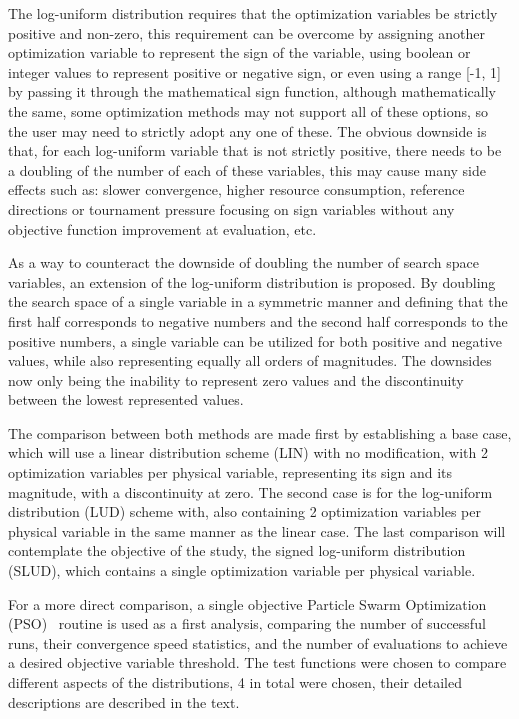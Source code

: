 \documentclass[10pt,fleqn,a4paper,twoside]{article}
\begin{document}
The log-uniform distribution requires that the optimization variables be strictly positive and non-zero, this requirement can be overcome by assigning another optimization variable
to represent the sign of the variable, using boolean or integer values to represent positive or negative sign, or even using a range [-1, 1] by passing it through the mathematical sign function, 
although mathematically the same, some optimization methods may not support all of these options, so the user may need to strictly adopt any one of these. The obvious downside is that, for each
log-uniform variable that is not strictly positive, there needs to be a doubling of the number of each of these variables, this may cause many side effects such as: slower convergence, higher 
resource consumption, reference directions or tournament pressure focusing on sign variables without any objective function improvement at evaluation, etc.

As a way to counteract the downside of doubling the number of search space variables, an extension of the log-uniform distribution is proposed. By doubling the search space of a single variable in 
a symmetric manner and defining that the first half corresponds to negative numbers and the second half corresponds to the positive numbers, a single variable can be utilized for both positive and
negative values, while also representing equally all orders of magnitudes. The downsides now only being the inability to represent zero values and the discontinuity between the lowest
represented values. 

The comparison between both methods are made first by establishing a base case, which will use a linear distribution scheme (LIN) with no modification, with 2 optimization variables per physical variable, representing 
its sign and its magnitude, with a discontinuity at zero. The second case is for the log-uniform distribution (LUD) scheme with, also containing 2 optimization variables per physical variable in the same manner as the 
linear case. The last comparison will contemplate the objective of the study, the signed log-uniform distribution (SLUD), which contains a single optimization variable per physical variable. 

For a more direct comparison, a single objective Particle Swarm Optimization (PSO)~\citep{Kennedy1995} routine is used as a first analysis, comparing the number of successful runs, their convergence speed statistics, and the number 
of evaluations to achieve a desired objective variable threshold. The test functions were chosen to compare different aspects of the distributions, 4 in total were chosen, their detailed descriptions 
are described in the text.
\end{document}

